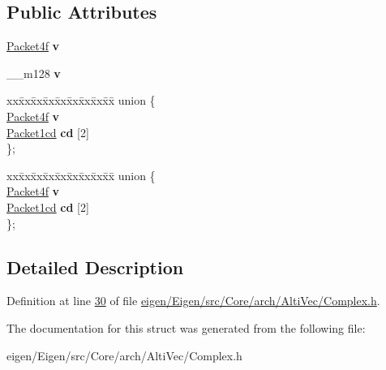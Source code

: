 \subsection*{Public Attributes}
\begin{DoxyCompactItemize}
\item 
\mbox{\label{struct_eigen_1_1internal_1_1_packet2cf_acd2643b2d029def252d3fd98eec2c054}} 
\hyperlink{struct_eigen_1_1internal_1_1_packet4f}{Packet4f} {\bfseries v}
\item 
\mbox{\label{struct_eigen_1_1internal_1_1_packet2cf_acd2643b2d029def252d3fd98eec2c054}} 
\+\_\+\+\_\+m128 {\bfseries v}
\item 
\mbox{\label{struct_eigen_1_1internal_1_1_packet2cf_ab954797b930c7719900ec8056d55568c}} 
\begin{tabbing}
xx\=xx\=xx\=xx\=xx\=xx\=xx\=xx\=xx\=\kill
union \{\\
\>\hyperlink{struct_eigen_1_1internal_1_1_packet4f}{Packet4f} {\bfseries v}\\
\>\hyperlink{struct_eigen_1_1internal_1_1_packet1cd}{Packet1cd} {\bfseries cd} \mbox{[}2\mbox{]}\\
\}; \\

\end{tabbing}\item 
\mbox{\label{struct_eigen_1_1internal_1_1_packet2cf_a8e35374d199e653028a5846aa137d704}} 
\begin{tabbing}
xx\=xx\=xx\=xx\=xx\=xx\=xx\=xx\=xx\=\kill
union \{\\
\>\hyperlink{struct_eigen_1_1internal_1_1_packet4f}{Packet4f} {\bfseries v}\\
\>\hyperlink{struct_eigen_1_1internal_1_1_packet1cd}{Packet1cd} {\bfseries cd} \mbox{[}2\mbox{]}\\
\}; \\

\end{tabbing}\end{DoxyCompactItemize}


\subsection{Detailed Description}


Definition at line \hyperlink{eigen_2_eigen_2src_2_core_2arch_2_alti_vec_2_complex_8h_source_l00030}{30} of file \hyperlink{eigen_2_eigen_2src_2_core_2arch_2_alti_vec_2_complex_8h_source}{eigen/\+Eigen/src/\+Core/arch/\+Alti\+Vec/\+Complex.\+h}.



The documentation for this struct was generated from the following file\+:\begin{DoxyCompactItemize}
\item 
eigen/\+Eigen/src/\+Core/arch/\+Alti\+Vec/\+Complex.\+h\end{DoxyCompactItemize}

